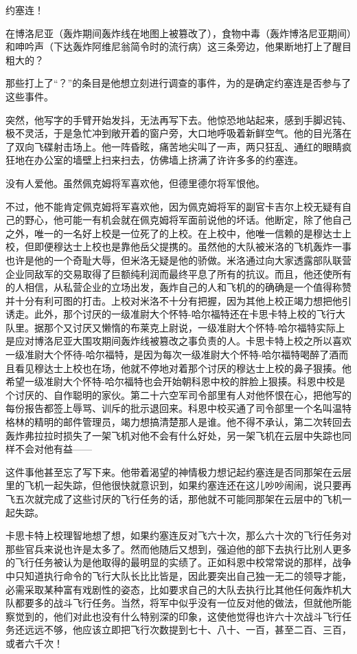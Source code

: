     约塞连！

    在博洛尼亚（轰炸期间轰炸线在地图上被篡改了），食物中毒（轰炸博洛尼亚期间）和呻吟声（下达轰炸阿维尼翁简令时的流行病）这三条旁边，他果断地打上了醒目粗大的？

    那些打上了“？”的条目是他想立刻进行调查的事件，为的是确定约塞连是否参与了这些事件。

    突然，他写字的手臂开始发抖，无法再写下去。他惊恐地站起来，感到手脚迟钝、极不灵活，于是急忙冲到敞开着的窗户旁，大口地呼吸着新鲜空气。他的目光落在了双向飞碟射击场上。他一阵昏眩，痛苦地尖叫了一声，两只狂乱、通红的眼睛疯狂地在办公室的墙壁上扫来扫去，仿佛墙上挤满了许许多多的约塞连。

    没有人爱他。虽然佩克姆将军喜欢他，但德里德尔将军恨他。

    不过，他不能肯定佩克姆将军喜欢他，因为佩克姆将军的副官卡吉尔上校无疑有自己的野心，他可能一有机会就在佩克姆将军面前说他的坏话。他断定，除了他自己之外，唯一的一名好上校是一位死了的上校。在上校中，他唯一信赖的是穆达士上校，但即便穆达士上校也是靠他岳父提携的。虽然他的大队被米洛的飞机轰炸一事也许是他的一个奇耻大辱，但米洛无疑是他的骄做。米洛通过向大家透露部队联营企业同敌军的交易取得了巨额纯利润而最终平息了所有的抗议。而且，他还使所有的人相信，从私营企业的立场出发，轰炸自己的人和飞机的的确确是一个值得称赞并十分有利可图的打击。上校对米洛不十分有把握，因为其他上校正竭力想把他引诱走。此外，那个讨厌的一级准尉大个怀特-哈尔福特还在卡思卡特上校的飞行大队里。据那个又讨厌又懒惰的布莱克上尉说，一级准尉大个怀特-哈尔福特实际上是应对博洛尼亚大围攻期间轰炸线被篡改之事负责的人。卡思卡特上校之所以喜欢一级准尉大个怀待-哈尔福特，是因为每次一级准尉大个怀特-哈尔福特喝醉了酒而且看见穆达士上校也在场，他就不停地对着那个讨厌的穆达士上校的鼻子狠揍。他希望一级准尉大个怀特-哈尔福特也会开始朝科恩中校的胖脸上狠揍。科恩中校是个讨厌的、自作聪明的家伙。第二十六空军司令部里有人对他怀恨在心，把他写的每份报告都签上辱骂、训斥的批示退回来。科恩中校买通了司令部里一个名叫温特格林的精明的邮件管理员，竭力想搞清楚那人是谁。他不得不承认，第二次转回去轰炸弗拉拉时损失了一架飞机对他不会有什么好处，另一架飞机在云层中失踪也同样不会对他有益——

    这件事他甚至忘了写下来。他带着渴望的神情极力想记起约塞连是否同那架在云层里的飞机一起失踪，但他很快就意识到，如果约塞连还在这儿吵吵闹闹，说只要再飞五次就完成了这些讨厌的飞行任务的话，那他就不可能同那架在云层中的飞机一起失踪。
 


    卡思卡特上校理智地想了想，如果约塞连反对飞六十次，那么六十次的飞行任务对那些官兵来说也许是太多了。然而他随后又想到，强迫他的部下去执行比别人更多的飞行任务被认为是他取得的最明显的实绩了。正如科恩中校常常说的那样，战争中只知道执行命令的飞行大队长比比皆是，因此要突出自己独一无二的领导才能，必需采取某种富有戏剧性的姿态，比如要求自己的大队去执行比其他任何轰炸机大队都要多的战斗飞行任务。当然，将军中似乎没有一位反对他的做法，但就他所能察觉到的，他们对此也没有什么特别深的印象，这使他觉得也许六十次战斗飞行任务还远远不够，他应该立即把飞行次数提到七十、八十、一百，甚至二百、三百，或者六千次！

